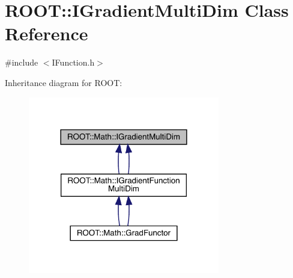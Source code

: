 \hypertarget{classROOT_1_1Math_1_1IGradientMultiDim}{}\section{R\+O\+OT\+:\+:I\+Gradient\+Multi\+Dim Class Reference}
\label{classROOT_1_1Math_1_1IGradientMultiDim}


{\ttfamily \#include $<$I\+Function.\+h$>$}



Inheritance diagram for R\+O\+OT\+:\nopagebreak
\begin{figure}[H]
\begin{center}
\leavevmode
\includegraphics[width=237pt]{d9/d37/classROOT_1_1Math_1_1IGradientMultiDim__inherit__graph}
\end{center}
\end{figure}

